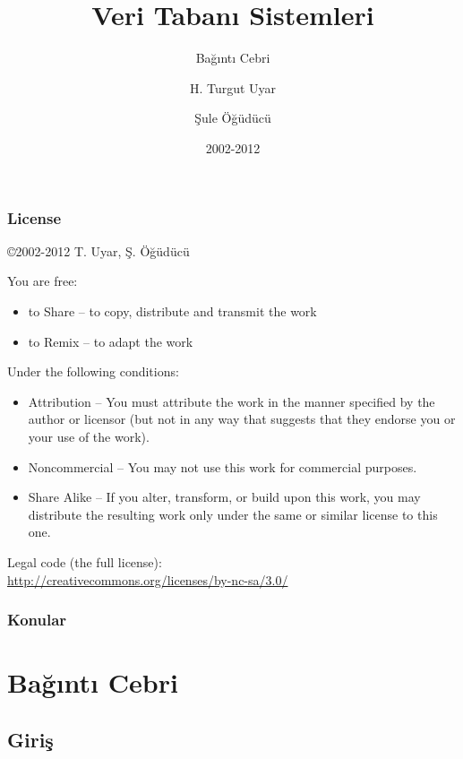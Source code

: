 \documentclass[dvipsnames]{beamer}
\title{Veri Tabanı Sistemleri}
\subtitle{Bağıntı Cebri}
\author{H. Turgut Uyar \and Şule Öğüdücü}
\date{2002-2012}
\theoremstyle{definition}
\theoremstyle{example}
\theoremstyle{plain}
\begin{document}
\begin{frame}
  \titlepage
\end{frame}

\begin{frame}
  \frametitle{License}

  \hfill
  \copyright 2002-2012 T. Uyar, Ş. Öğüdücü

  \vfill
  \begin{tiny}
    You are free:
    \begin{itemize}
      \item to Share -- to copy, distribute and transmit the work
      \item to Remix -- to adapt the work
    \end{itemize}

    Under the following conditions:
    \begin{itemize}
      \item Attribution -- You must attribute the work in the manner specified by
        the author or licensor (but not in any way that suggests that they
        endorse you or your use of the work).

      \item Noncommercial -- You may not use this work for commercial purposes.

      \item Share Alike -- If you alter, transform, or build upon this work, you
        may distribute the resulting work only under the same or similar license
        to this one.
    \end{itemize}
  \end{tiny}

  \vfill
  Legal code (the full license):\\
  \url{http://creativecommons.org/licenses/by-nc-sa/3.0/}
\end{frame}

\begin{frame}
  \frametitle{Konular}
  \tableofcontents
\end{frame}

\lstset{language=TutorialD}

\section{Bağıntı Cebri}

\subsection{Giriş}
\end{document}
